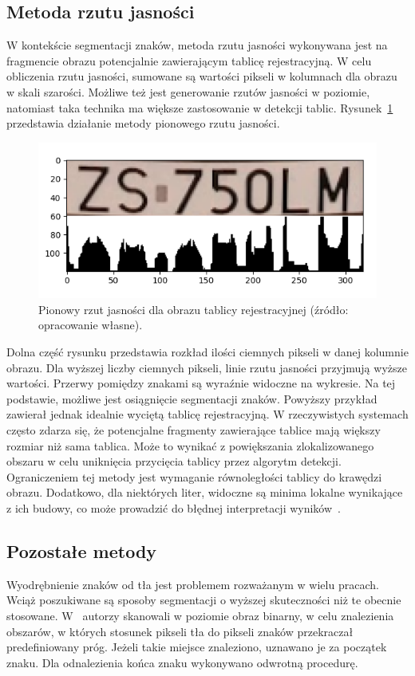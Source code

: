 \subsection{Metoda rzutu jasności}
W kontekście segmentacji znaków, metoda rzutu jasności wykonywana jest na fragmencie obrazu potencjalnie zawierającym tablicę rejestracyjną.
W celu obliczenia rzutu jasności, sumowane są wartości pikseli w kolumnach dla obrazu w skali szarości.
Możliwe też jest generowanie rzutów jasności w poziomie, natomiast taka technika ma większe zastosowanie w detekcji tablic.
Rysunek~\ref{fig:hist_projection} przedstawia działanie metody pionowego rzutu jasności.
\begin{figure}[!ht]
    \centering
    \includegraphics[scale=0.6]{Pictures/hist_projection}
    \caption{Pionowy rzut jasności dla obrazu tablicy rejestracyjnej (źródło: opracowanie własne).}
    \label{fig:hist_projection}
\end{figure}
\FloatBarrier
Dolna część rysunku przedstawia rozkład ilości ciemnych pikseli w danej kolumnie obrazu.
Dla wyższej liczby ciemnych pikseli, linie rzutu jasności przyjmują wyższe wartości.
Przerwy pomiędzy znakami są wyraźnie widoczne na wykresie.
Na tej podstawie, możliwe jest osiągnięcie segmentacji znaków.
Powyższy przykład zawierał jednak idealnie wyciętą tablicę rejestracyjną.
W rzeczywistych systemach często zdarza się, że potencjalne fragmenty zawierające tablice mają większy rozmiar niż sama tablica.
Może to wynikać z powiększania zlokalizowanego obszaru w celu uniknięcia przycięcia tablicy przez algorytm detekcji.
Ograniczeniem tej metody jest wymaganie równoległości tablicy do krawędzi obrazu.
Dodatkowo, dla niektórych liter, widoczne są minima lokalne wynikające z ich budowy, co może prowadzić do błędnej interpretacji wyników~\cite{Półrolniczak_2012}.

\subsection{Pozostałe metody}
Wyodrębnienie znaków od tła jest problemem rozważanym w wielu pracach.
Wciąż poszukiwane są sposoby segmentacji o wyższej skuteczności niż te obecnie stosowane.
W~\cite{686064} autorzy skanowali w poziomie obraz binarny, w celu znalezienia obszarów, w których stosunek pikseli tła do pikseli znaków przekraczał predefiniowany próg.
Jeżeli takie miejsce znaleziono, uznawano je za początek znaku.
Dla odnalezienia końca znaku wykonywano odwrotną procedurę.

